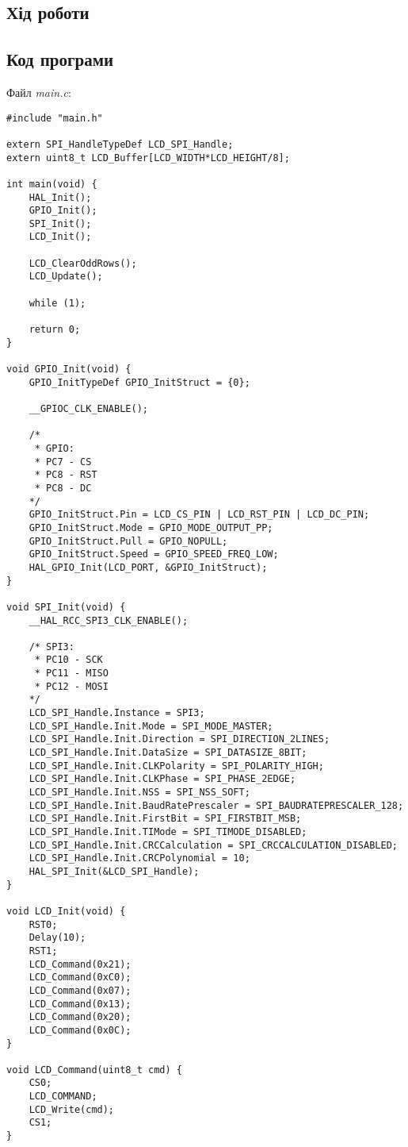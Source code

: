 \documentclass[oneside,14pt]{extarticle}
\begin{document}
\begin{normalsize}
	\section*{Хід роботи}
	
	\subsection*{Код програми}
	Файл \textit{main.c}:
	{\small
		\begin{lstlisting}
#include "main.h"

extern SPI_HandleTypeDef LCD_SPI_Handle;
extern uint8_t LCD_Buffer[LCD_WIDTH*LCD_HEIGHT/8];

int main(void) {
	HAL_Init();
	GPIO_Init();
	SPI_Init();
	LCD_Init();
	
	LCD_ClearOddRows();
	LCD_Update();
	
	while (1);
	
	return 0;
}

void GPIO_Init(void) {
	GPIO_InitTypeDef GPIO_InitStruct = {0};

	__GPIOC_CLK_ENABLE();

    /*
     * GPIO:
     * PC7 - CS
     * PC8 - RST
     * PC8 - DC
    */
	GPIO_InitStruct.Pin = LCD_CS_PIN | LCD_RST_PIN | LCD_DC_PIN;
	GPIO_InitStruct.Mode = GPIO_MODE_OUTPUT_PP;
	GPIO_InitStruct.Pull = GPIO_NOPULL;
	GPIO_InitStruct.Speed = GPIO_SPEED_FREQ_LOW;
	HAL_GPIO_Init(LCD_PORT, &GPIO_InitStruct);
}

void SPI_Init(void) {
	__HAL_RCC_SPI3_CLK_ENABLE();

    /* SPI3:
     * PC10 - SCK
     * PC11 - MISO
     * PC12 - MOSI
    */
	LCD_SPI_Handle.Instance = SPI3;
	LCD_SPI_Handle.Init.Mode = SPI_MODE_MASTER;
	LCD_SPI_Handle.Init.Direction = SPI_DIRECTION_2LINES;
	LCD_SPI_Handle.Init.DataSize = SPI_DATASIZE_8BIT;
	LCD_SPI_Handle.Init.CLKPolarity = SPI_POLARITY_HIGH;
	LCD_SPI_Handle.Init.CLKPhase = SPI_PHASE_2EDGE;
	LCD_SPI_Handle.Init.NSS = SPI_NSS_SOFT;
	LCD_SPI_Handle.Init.BaudRatePrescaler = SPI_BAUDRATEPRESCALER_128;
	LCD_SPI_Handle.Init.FirstBit = SPI_FIRSTBIT_MSB;
	LCD_SPI_Handle.Init.TIMode = SPI_TIMODE_DISABLED;
	LCD_SPI_Handle.Init.CRCCalculation = SPI_CRCCALCULATION_DISABLED;
	LCD_SPI_Handle.Init.CRCPolynomial = 10;
	HAL_SPI_Init(&LCD_SPI_Handle);
}

void LCD_Init(void) {
	RST0;
	Delay(10);
	RST1;
	LCD_Command(0x21);
	LCD_Command(0xC0);
	LCD_Command(0x07);
	LCD_Command(0x13);
	LCD_Command(0x20);
	LCD_Command(0x0C);
}

void LCD_Command(uint8_t cmd) {
	CS0;
	LCD_COMMAND;
	LCD_Write(cmd);
	CS1;
}


\end{lstlisting}}
\end{normalsize}
\end{document}

